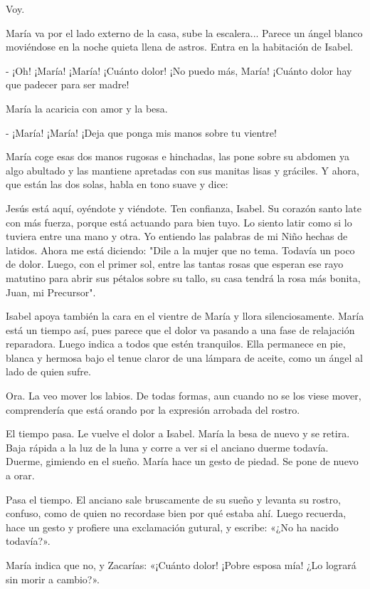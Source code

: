\documentclass[12pt, twoside, openright]{book} %
\begin{document}
Voy. 

María va por el lado externo de la casa, sube la escalera... Parece un ángel blanco moviéndose en la noche quieta llena de astros. Entra en la habitación de Isabel. 

- ¡Oh! ¡María! ¡María! ¡Cuánto dolor! ¡No puedo más, María! ¡Cuánto dolor hay que padecer para ser madre! 

María la acaricia con amor y la besa. 

- ¡María! ¡María! ¡Deja que ponga mis manos sobre tu vientre! 

María coge esas dos manos rugosas e hinchadas, las pone sobre su abdomen ya algo abultado y las mantiene apretadas con sus manitas lisas y gráciles. Y ahora, que están las dos solas, habla en tono suave y dice: 

Jesús está aquí, oyéndote y viéndote. Ten confianza, Isabel. Su corazón santo late con más fuerza, porque está actuando para bien tuyo. Lo siento latir como si lo tuviera entre una mano y otra. Yo entiendo las palabras de mi Niño hechas de latidos. Ahora me está diciendo: "Dile a la mujer que no tema. Todavía un poco de dolor. Luego, con el primer sol, entre las tantas rosas que esperan ese rayo matutino para abrir sus pétalos sobre su tallo, su casa tendrá la rosa más bonita, Juan, mi Precursor". 

Isabel apoya también la cara en el vientre de María y llora silenciosamente. María está un tiempo así, pues parece que el dolor va pasando a una fase de relajación reparadora. Luego indica a todos que estén tranquilos. Ella permanece en pie, blanca y hermosa bajo el tenue claror de una lámpara de aceite, como un ángel al lado de quien sufre. 

Ora. La veo mover los labios. De todas formas, aun cuando no se los viese mover, comprendería que está orando por la expresión arrobada del rostro. 

El tiempo pasa. Le vuelve el dolor a Isabel. María la besa de nuevo y se retira. Baja rápida a la luz de la luna y corre a ver si el anciano duerme todavía. Duerme, gimiendo en el sueño. María hace un gesto de piedad. Se pone de nuevo a orar. 

Pasa el tiempo. El anciano sale bruscamente de su sueño y levanta su rostro, confuso, como de quien no recordase bien por qué estaba ahí. Luego recuerda, hace un gesto y profiere una exclamación gutural, y escribe: «¿No ha nacido todavía?». 

María indica que no, y Zacarías: «¡Cuánto dolor! ¡Pobre esposa mía! ¿Lo logrará sin morir a cambio?». 
\end{document}
